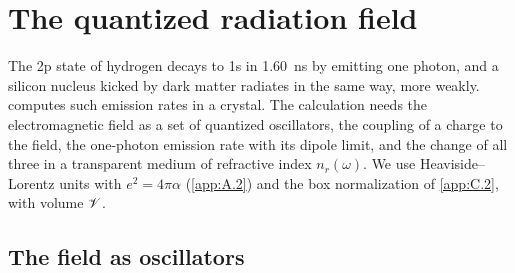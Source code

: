 \section{The quantized radiation field}\label{app:C.16}

The 2p state of hydrogen decays to 1s in \SI{1.60}{ns} by emitting one photon, and a silicon nucleus kicked by dark matter radiates in the same way, more weakly.  computes such emission rates in a crystal. The calculation needs the electromagnetic field as a set of quantized oscillators, the coupling of a charge to the field, the one-photon emission rate with its dipole limit, and the change of all three in a transparent medium of refractive index $n_r(\omega)$. We use Heaviside--Lorentz units with $e^2 = 4\pi\alpha$ (\cref{app:A.2}) and the box normalization of \cref{app:C.2}, with volume $\mathscr{V}$.

\subsection{The field as oscillators}

